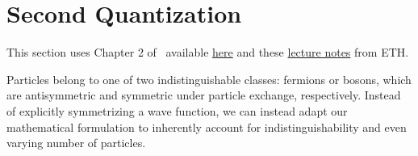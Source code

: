 \section{Second Quantization}
This section uses Chapter 2 of~\cite{altland2010condensed} 
available \href{https://www.tcm.phy.cam.ac.uk/~bds10/tp3/secqu.pdf}{here} and 
these \href{https://ethz.ch/content/dam/ethz/special-interest/phys/theoretical-physics/cmtm-dam/documents/qg/Chapter_05-06.pdf} 
{lecture notes} from ETH. 

Particles belong to one of two indistinguishable classes: fermions or bosons, which are 
antisymmetric and symmetric under particle exchange, respectively. Instead of explicitly 
symmetrizing a wave function, we can instead adapt our mathematical formulation to 
inherently account for indistinguishability and even varying number of particles. 

